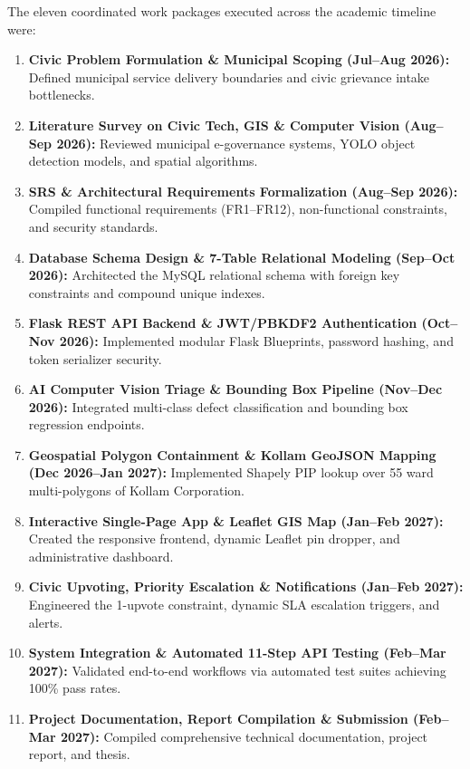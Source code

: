 \documentclass[12pt,a4paper]{report}
\begin{document}
The eleven coordinated work packages executed across the academic timeline were:
\begin{enumerate}
    \item \textbf{Civic Problem Formulation \& Municipal Scoping (Jul--Aug 2026):} Defined municipal service delivery boundaries and civic grievance intake bottlenecks.
    \item \textbf{Literature Survey on Civic Tech, GIS \& Computer Vision (Aug--Sep 2026):} Reviewed municipal e-governance systems, YOLO object detection models, and spatial algorithms.
    \item \textbf{SRS \& Architectural Requirements Formalization (Aug--Sep 2026):} Compiled functional requirements (FR1--FR12), non-functional constraints, and security standards.
    \item \textbf{Database Schema Design \& 7-Table Relational Modeling (Sep--Oct 2026):} Architected the MySQL relational schema with foreign key constraints and compound unique indexes.
    \item \textbf{Flask REST API Backend \& JWT/PBKDF2 Authentication (Oct--Nov 2026):} Implemented modular Flask Blueprints, password hashing, and token serializer security.
    \item \textbf{AI Computer Vision Triage \& Bounding Box Pipeline (Nov--Dec 2026):} Integrated multi-class defect classification and bounding box regression endpoints.
    \item \textbf{Geospatial Polygon Containment \& Kollam GeoJSON Mapping (Dec 2026--Jan 2027):} Implemented Shapely PIP lookup over 55 ward multi-polygons of Kollam Corporation.
    \item \textbf{Interactive Single-Page App \& Leaflet GIS Map (Jan--Feb 2027):} Created the responsive frontend, dynamic Leaflet pin dropper, and administrative dashboard.
    \item \textbf{Civic Upvoting, Priority Escalation \& Notifications (Jan--Feb 2027):} Engineered the 1-upvote constraint, dynamic SLA escalation triggers, and alerts.
    \item \textbf{System Integration \& Automated 11-Step API Testing (Feb--Mar 2027):} Validated end-to-end workflows via automated test suites achieving 100\% pass rates.
    \item \textbf{Project Documentation, Report Compilation \& Submission (Feb--Mar 2027):} Compiled comprehensive technical documentation, project report, and thesis.
\end{enumerate}
\end{document}
